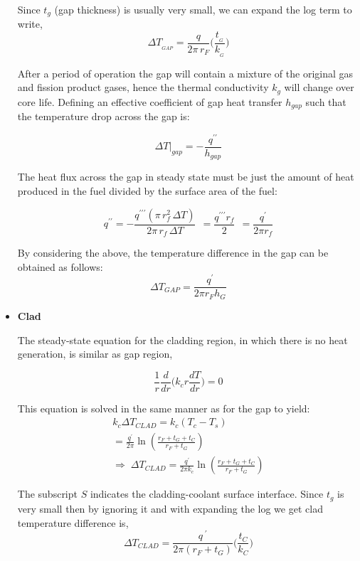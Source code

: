 \documentclass[12pt]{article}
\begin{document}
\begin{multicols}{2}
\begin{itemize}
Since $t_g$ (gap thickness) is usually very small, we can expand the log term to write,
\begin{equation}\label{eq:19}
    \Delta T_{_{G A P}}=\frac{q}{2\mathcal{\pi}\,r_{F}}\biggl(\frac{t_{_G}}{k_{_G}}\biggr)
\end{equation}

After a period of operation the gap will contain a mixture of the original gas and fission product gases, hence the thermal conductivity $k_g$ will change over core life. Defining an effective coefficient of gap heat transfer $h_{gap}$ such that the temperature drop across the gap is:

\[\Delta T\Big|_{g a p}=-\frac{q^{\prime \prime}}{h_{g a p}}\]

The heat flux across the gap in steady state must be just the amount of heat produced in the fuel divided by the surface area of the fuel:

\[q^{\prime \prime}=-{\frac{q^{\prime \prime \prime}\left(\pi\,r_{f}^{2}\,\Delta T\right)}{2\pi\,r_{f}\,\Delta T}}\ \ ={\frac{q^{\prime \prime \prime}r_{f}}{2}}\ \ ={\frac{q^{\prime}}{2\pi r_{f}}}\]

By considering the above, the temperature difference in the gap can be obtained as follows:
\begin{equation}\label{eq:20}
    \Delta T_{G A P}=\frac{q^{\prime}}{2\pi r_{F}h_{G}}
\end{equation}

\item[] \textbf{Clad} 

The steady-state equation for the cladding region, in which there is no heat generation, is similar as gap region,

\[{\frac{1}{r}}{\frac{d}{d r}}{\Bigg(}k_{c}r{\frac{d T}{d r}}{\Bigg)}=0\]

This equation is solved in the same manner as for the gap to yield:
\begin{equation}\label{eq:21}
\begin{gathered}
        k_{c}\Delta T_{C L A D}=k_{c}\left(T_{c}-T_{s}\right) \\ =\frac{q^{\prime}}{2\pi}\ln\left(\frac{r_{F}+t_{G}+t_{C}}{r_{F}+t_{G}}\right) \\ \Rightarrow\;\Delta T_{C L A D}=\frac{q^{'}}{2\pi k_{c}}\ln\left(\frac{r_{F}+t_{G}+t_{C}}{r_{F}+t_{G}}\right)
\end{gathered}
\end{equation}

The subscript $S$ indicates the cladding-coolant surface interface. Since $t_g$ is very small then by ignoring it and with expanding the log we get clad temperature difference is,
\begin{equation}\label{eq:22}
    \Delta T_{\scriptscriptstyle C L A D}=\frac{q^{\;\prime}}{2\pi\left(r_{F}+t_{\scriptscriptstyle G}\right)}\bigg(\frac{t_{\scriptscriptstyle C}}{k_{\scriptscriptstyle C}}\bigg)
\end{equation}


\end{itemize}
\end{multicols}
\end{document}
